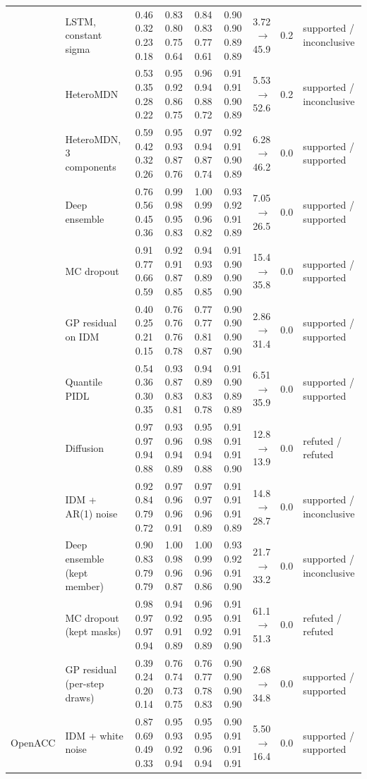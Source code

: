 \begin{longtable}{llrrrrrrl}
 & LSTM, constant sigma & 0.46 0.32 0.23 0.18 & 0.83 0.80 0.75 0.64 & 0.84 0.83 0.77 0.61 & 0.90 0.90 0.89 0.89 & 3.72 $\rightarrow$ 45.9 & 0.2 & supported / inconclusive \\
 & HeteroMDN & 0.53 0.35 0.28 0.22 & 0.95 0.92 0.86 0.75 & 0.96 0.94 0.88 0.72 & 0.91 0.91 0.90 0.89 & 5.53 $\rightarrow$ 52.6 & 0.2 & supported / inconclusive \\
 & HeteroMDN, 3 components & 0.59 0.42 0.32 0.26 & 0.95 0.93 0.87 0.76 & 0.97 0.94 0.87 0.74 & 0.92 0.91 0.90 0.89 & 6.28 $\rightarrow$ 46.2 & 0.0 & supported / supported \\
 & Deep ensemble & 0.76 0.56 0.45 0.36 & 0.99 0.98 0.95 0.83 & 1.00 0.99 0.96 0.82 & 0.93 0.92 0.91 0.89 & 7.05 $\rightarrow$ 26.5 & 0.0 & supported / supported \\
 & MC dropout & 0.91 0.77 0.66 0.59 & 0.92 0.91 0.87 0.85 & 0.94 0.93 0.89 0.85 & 0.91 0.90 0.90 0.90 & 15.4 $\rightarrow$ 35.8 & 0.0 & supported / supported \\
 & GP residual on IDM & 0.40 0.25 0.21 0.15 & 0.76 0.76 0.76 0.78 & 0.77 0.77 0.81 0.87 & 0.90 0.90 0.90 0.90 & 2.86 $\rightarrow$ 31.4 & 0.0 & supported / supported \\
 & Quantile PIDL & 0.54 0.36 0.30 0.35 & 0.93 0.87 0.83 0.81 & 0.94 0.89 0.83 0.78 & 0.91 0.90 0.89 0.89 & 6.51 $\rightarrow$ 35.9 & 0.0 & supported / supported \\
 & Diffusion & 0.97 0.97 0.94 0.88 & 0.93 0.96 0.94 0.89 & 0.95 0.98 0.94 0.88 & 0.91 0.91 0.91 0.90 & 12.8 $\rightarrow$ 13.9 & 0.0 & refuted / refuted \\
 & IDM + AR(1) noise & 0.92 0.84 0.79 0.72 & 0.97 0.96 0.96 0.91 & 0.97 0.97 0.96 0.89 & 0.91 0.91 0.91 0.89 & 14.8 $\rightarrow$ 28.7 & 0.0 & supported / inconclusive \\
 & Deep ensemble (kept member) & 0.90 0.83 0.79 0.79 & 1.00 0.98 0.96 0.87 & 1.00 0.99 0.96 0.86 & 0.93 0.92 0.91 0.90 & 21.7 $\rightarrow$ 33.2 & 0.0 & supported / inconclusive \\
 & MC dropout (kept masks) & 0.98 0.97 0.97 0.94 & 0.94 0.92 0.91 0.89 & 0.96 0.95 0.92 0.89 & 0.91 0.91 0.91 0.90 & 61.1 $\rightarrow$ 51.3 & 0.0 & refuted / refuted \\
 & GP residual (per-step draws) & 0.39 0.24 0.20 0.14 & 0.76 0.74 0.73 0.75 & 0.76 0.77 0.78 0.83 & 0.90 0.90 0.90 0.90 & 2.68 $\rightarrow$ 34.8 & 0.0 & supported / supported \\
\midrule
OpenACC & IDM + white noise & 0.87 0.69 0.49 0.33 & 0.95 0.93 0.92 0.94 & 0.95 0.95 0.96 0.94 & 0.90 0.91 0.91 0.91 & 5.50 $\rightarrow$ 16.4 & 0.0 & supported / supported \\

\end{longtable}
